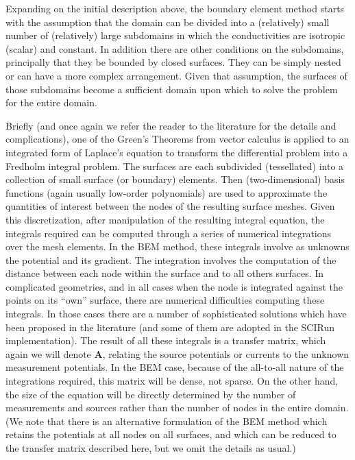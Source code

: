 Expanding on the initial description above, the boundary element method starts with the assumption
that the domain can be divided into a (relatively) small number of
(relatively) large subdomains in which the conductivities are isotropic
(scalar) and constant. In addition there are other conditions on the
subdomains, principally that they be bounded by closed surfaces.
They can be simply nested or can have a more complex arrangement. Given
that assumption, the surfaces of those subdomains become a sufficient
domain upon which to solve the problem for the entire domain.

Briefly (and once again we refer the reader to the literature for the
details and complications), one of the Green's Theorems from vector
calculus is applied to an integrated form of Laplace's equation to transform the
differential problem into a Fredholm integral problem. The surfaces are
each subdivided (tessellated) into a collection of small surface (or
boundary) elements. Then (two-dimensional) basis functions (again usually
low-order polynomials) are used to
approximate the quantities of interest between the nodes of the resulting
surface meshes. Given this discretization, after
manipulation of the resulting integral equation,
the integrals required can
be computed through a series of numerical integrations over the mesh
elements.
In the BEM method, these integrals involve as unknowns the
potential and its gradient. The integration involves the computation of the
distance between each node within the surface and to all others surfaces.
In complicated geometries, and in all cases when the node is integrated against the points on its ``own''
surface, there are numerical difficulties computing these integrals. In those cases
there are a number of sophisticated solutions which have been proposed in the literature (and
some of them are adopted in the SCIRun implementation).
The result of all these integrals is a transfer matrix, which again we will
denote $\mathbf{A}$, relating the source potentials or currents to the
unknown measurement potentials. In the BEM case, because of the all-to-all
nature of the integrations required, this matrix will be dense, not
sparse. On the other hand, the size of the equation will be directly
determined by the number of measurements and sources rather than the
number of nodes in the entire domain. (We note that there is an alternative
formulation of the BEM method which retains the potentials at all nodes on
all surfaces, and which can be reduced to the transfer matrix described
here, but we omit the details as usual.)



